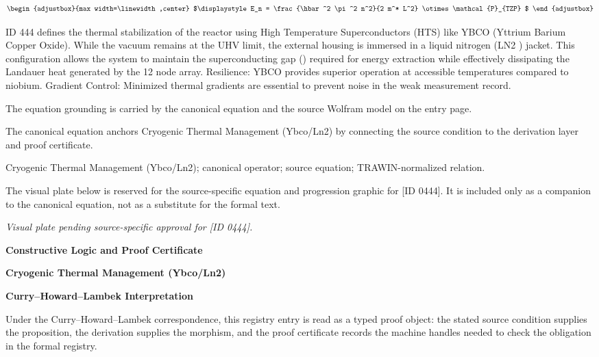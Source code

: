 \[
\begin{adjustbox}{max width=\linewidth,center}
$\displaystyle
E_n = \frac{\hbar^2 \pi^2 n^2}{2 m^* L^2} \otimes \mathcal{P}_{TZP}
$
\end{adjustbox}
\]

ID 444 defines the thermal stabilization of the reactor using High Temperature Superconductors (HTS) like YBCO (Yttrium Barium Copper Oxide). While the vacuum remains at the UHV limit, the external housing is immersed in a liquid nitrogen (LN2 ) jacket. This configuration allows the system to maintain the superconducting gap () required for energy extraction while effectively dissipating the Landauer heat generated by the 12 node array. Resilience: YBCO provides superior operation at accessible temperatures compared to niobium. Gradient Control: Minimized thermal gradients are essential to prevent noise in the weak measurement record.

The equation grounding is carried by the canonical equation and the source Wolfram model on the entry page.

The canonical equation anchors Cryogenic Thermal Management (Ybco/Ln2) by connecting the source condition to the derivation layer and proof certificate.

Cryogenic Thermal Management (Ybco/Ln2); canonical operator; source equation; TRAWIN-normalized relation.
\endgroup

\begingroup\footnotesize\sloppy
The visual plate below is reserved for the source-specific equation and progression graphic for [ID 0444]. It is included only as a companion to the canonical equation, not as a substitute for the formal text.
\par\endgroup
\begingroup\footnotesize\itshape
Visual plate pending source-specific approval for [ID 0444].
\par\endgroup

\clearpage
\begingroup\tzpsupportsetup
\noindent\textbf{\fontsize{10.8pt}{12.8pt}\selectfont [ID 0444] Constructive Logic and Proof Certificate}\par
\noindent\textbf{\fontsize{10pt}{12pt}\selectfont Cryogenic Thermal Management (Ybco/Ln2)}\par
\vspace{0.45em}
\begingroup
\footnotesize
\setlength{\parskip}{0.22em}
\setlength{\parindent}{0pt}
\noindent\textbf{Curry--Howard--Lambek Interpretation}\par
Under the Curry--Howard--Lambek correspondence, this registry entry is read as a typed proof
object: the stated source condition supplies the proposition, the derivation supplies the
morphism, and the proof certificate records the machine handles needed to check the obligation
in the formal registry.


